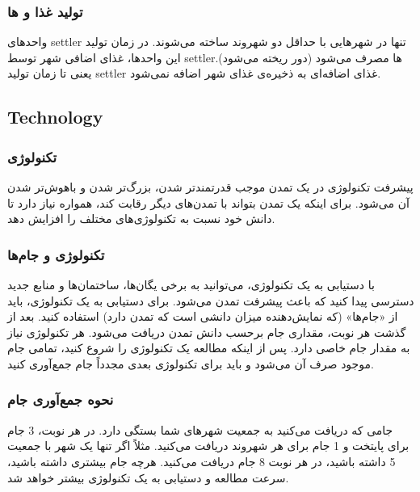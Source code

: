 \documentclass[]{article}
\begin{document}
\subsubsection*{{\titr تولید غذا و ها}}
واحدهای settler تنها در شهرهایی با حداقل دو شهروند ساخته می‌شوند. در زمان تولید این واحدها، غذای اضافی شهر توسط settlerها مصرف می‌شود (دور ریخته می‌شود). یعنی تا زمان تولید settler غذای اضافه‌ای به ذخیره‌ی غذای شهر اضافه نمی‌شود.



\subsection*{{\titr Technology}}


\subsubsection*{{\titr تکنولوژی}}
پیشرفت تکنولوژی در یک تمدن موجب قدرتمندتر شدن، بزرگ‌تر شدن و باهوش‌تر شدن آن می‌شود. برای اینکه یک تمدن بتواند با تمدن‌های دیگر رقابت کند، همواره نیاز دارد تا دانش خود نسبت به تکنولوژی‌های مختلف را افزایش دهد.

\subsubsection*{{\titr تکنولوژی و جام‌ها}}
با دستیابی به یک تکنولوژی، می‌توانید به برخی یگان‌ها، ساختمان‌ها و منابع جدید دسترسی پیدا کنید که باعث پیشرفت تمدن می‌شود. برای دستیابی به یک تکنولوژی، باید از «جام‌ها» (که نمایش‌دهنده میزان دانشی است که تمدن دارد) استفاده کنید.
بعد از گذشت هر نوبت، مقداری جام برحسب دانش تمدن دریافت می‌شود. هر تکنولوژی نیاز به مقدار جام خاصی دارد. پس از اینکه مطالعه یک تکنولوژی را شروع کنید، تمامی جام موجود صرف آن می‌شود و باید برای تکنولوژی بعدی مجدداً جام جمع‌آوری کنید.

\subsubsection*{{\titr نحوه جمع‌آوری جام}}
جامی که دریافت می‌کنید به جمعیت شهرهای شما بستگی دارد. در هر نوبت، 3 جام برای پایتخت و 1 جام برای هر شهروند دریافت می‌کنید. مثلاً اگر تنها یک شهر با جمعیت 5 داشته باشید، در هر نوبت 8 جام دریافت می‌کنید. هرچه جام بیشتری داشته باشید، سرعت مطالعه و دستیابی به یک تکنولوژی بیشتر خواهد شد.
\end{document}
